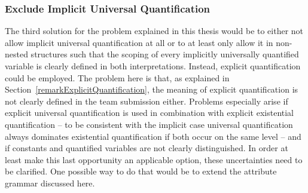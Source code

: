 \subsubsection{Exclude Implicit Universal Quantification}
The third solution for the problem explained in this thesis would be 
to either not allow implicit universal quantification at all or to at least only allow it in non-nested structures such that the scoping of every implicitly universally quantified variable is clearly
defined in both interpretations. Instead, 
explicit quantification could be employed.
The problem here is that, as explained in Section~\ref{remarkExplicitQuantification},
the meaning of explicit quantification is not clearly defined in the \wwwc team submission either. Problems especially arise if explicit universal quantification is used in combination with explicit
existential quantification -- to be consistent with the implicit case universal quantification always dominates existential quantification if both occur on the same level -- and if constants and 
quantified variables are not clearly distinguished. In order at least make this last opportunity an applicable option, these uncertainties need to be clarified. 
One possible way to do that would be to
extend the attribute grammar discussed here.


